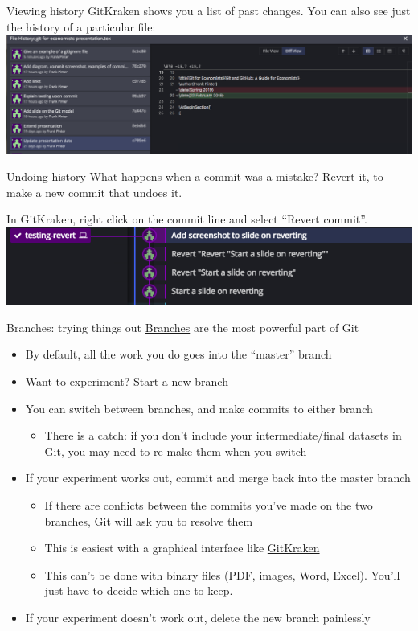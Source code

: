 \documentclass{beamer}
\begin{document}
\begin{frame}{Viewing history}
GitKraken shows you a list of past changes. You can also see just the history of a particular file:
\includegraphics[width=\textwidth]{screenshots/history-diff.png}
\end{frame}

\begin{frame}{Undoing history}
What happens when a commit was a mistake? Revert it, to make a new commit that undoes it.

In GitKraken, right click on the commit line and select ``Revert commit''.
\includegraphics[width=\textwidth]{screenshots/revert-history.png}
\end{frame}

\begin{frame}{Branches: trying things out}
\href{https://git-scm.com/book/en/v2/Git-Branching-Branches-in-a-Nutshell}{Branches} are the most powerful part of Git
\begin{itemize}
\item By default, all the work you do goes into the ``master'' branch
\item Want to experiment? Start a new branch
\item You can switch between branches, and make commits to either branch
\begin{itemize}
\item There is a catch: if you don't include your intermediate/final datasets in Git, you may need to re-make them when you switch
\end{itemize}
\item If your experiment works out, commit and merge back into the master branch
\begin{itemize}
\item If there are conflicts between the commits you've made on the two branches, Git will ask you to resolve them
\item This is easiest with a graphical interface like \href{https://support.gitkraken.com/working-with-repositories/branching-and-merging/}{GitKraken}
\item This can't be done with binary files (PDF, images, Word, Excel). You'll just have to decide which one to keep.
\end{itemize}
\item If your experiment doesn't work out, delete the new branch painlessly
\end{itemize}
\end{frame}
\end{document}
